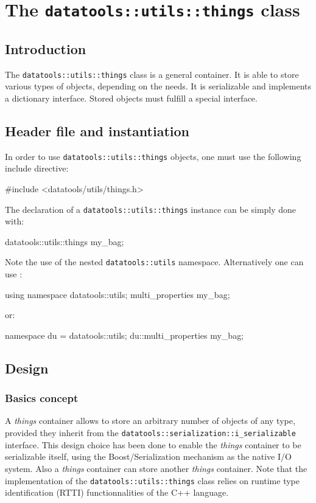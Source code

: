 \section{The \texttt{datatools::utils::things} class}\label{sec:things}

\subsection{Introduction}

The  \texttt{datatools::utils::things} class  is a  general container.
It is able to store various  types of objects, depending on the needs.
It  is  serializable and  implements  a  dictionary interface.  Stored
objects must fulfill a special interface.

\subsection{Header file and instantiation}

\pn  In   order  to  use  \texttt{datatools::utils::things}
objects, one must use the following include directive:
\begin{CppVerbatim} 
#include <datatools/utils/things.h>
\end{CppVerbatim}

\pn The  declaration of a \texttt{datatools::utils::things}
instance can be simply done with:
\begin{CppVerbatim} 
datatools::utils::things my_bag;
\end{CppVerbatim}
\pn Note  the use  of the nested  \texttt{datatools::utils} namespace.
Alternatively one can use :
\begin{CppVerbatim} 
using namespace datatools::utils;
multi_properties my_bag;
\end{CppVerbatim}
\pn or:
\begin{CppVerbatim} 
namespace du = datatools::utils;
du::multi_properties my_bag;
\end{CppVerbatim}

\subsection{Design}

\subsubsection{Basics concept}

A  \emph{things} container  allows  to store  an  arbitrary number  of
objects   of    any   type,    provided   they   inherit    from   the
\texttt{datatools::serialization::i\_serializable}   interface.   This
design choice has  been done to enable the  \emph{things} container to
be serializable itself, using the Boost/Serialization mechanism as the
native I/O  system. Also a  \emph{things} container can  store another
\emph{things}   container.  Note  that   the  implementation   of  the
\texttt{datatools::utils::things}   class  relies   on   runtime  type
identification (RTTI) functionnalities of the C++ language.

